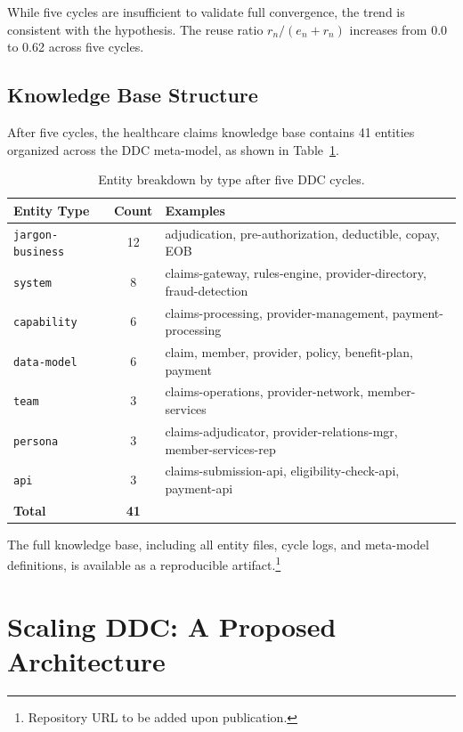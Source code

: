 \documentclass[11pt,a4paper]{article}
\begin{document}
While five cycles are insufficient to validate full convergence, the trend is consistent with the hypothesis. The reuse ratio $r_n / (e_n + r_n)$ increases from 0.0 to 0.62 across five cycles.

\subsection{Knowledge Base Structure}

After five cycles, the healthcare claims knowledge base contains 41 entities organized across the DDC meta-model, as shown in Table~\ref{tab:entity-breakdown}.

\begin{table}[h]
\centering
\caption{Entity breakdown by type after five DDC cycles.}
\label{tab:entity-breakdown}
\begin{tabular}{@{}lcp{5cm}@{}}
\toprule
\textbf{Entity Type} & \textbf{Count} & \textbf{Examples} \\
\midrule
\texttt{jargon-business} & 12 & adjudication, pre-authorization, deductible, copay, EOB \\
\texttt{system} & 8 & claims-gateway, rules-engine, provider-directory, fraud-detection \\
\texttt{capability} & 6 & claims-processing, provider-management, payment-processing \\
\texttt{data-model} & 6 & claim, member, provider, policy, benefit-plan, payment \\
\texttt{team} & 3 & claims-operations, provider-network, member-services \\
\texttt{persona} & 3 & claims-adjudicator, provider-relations-mgr, member-services-rep \\
\texttt{api} & 3 & claims-submission-api, eligibility-check-api, payment-api \\
\midrule
\textbf{Total} & \textbf{41} & \\
\bottomrule
\end{tabular}
\end{table}

The full knowledge base, including all entity files, cycle logs, and meta-model definitions, is available as a reproducible artifact.\footnote{Repository URL to be added upon publication.}

\section{Scaling DDC: A Proposed Architecture}
\label{sec:scaling}
\end{document}
